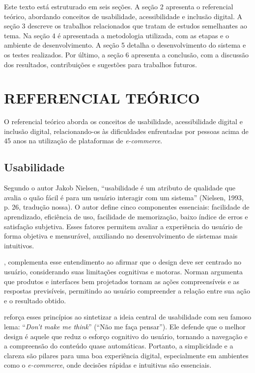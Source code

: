 \documentclass[12pt,a4paper]{article}
\begin{document}
Este texto está estruturado em seis seções. A seção 2 apresenta o referencial teórico, abordando conceitos de usabilidade, acessibilidade e inclusão digital. A seção 3 descreve os trabalhos relacionados que tratam de estudos semelhantes ao tema. Na seção 4 é apresentada a metodologia utilizada, com as etapas e o ambiente de desenvolvimento. A seção 5 detalha o desenvolvimento do sistema e os testes realizados. Por último, a seção 6 apresenta a conclusão, com a discussão dos resultados, contribuições e sugestões para trabalhos futuros.

\section{REFERENCIAL TEÓRICO}

O referencial teórico aborda os conceitos de usabilidade, acessibilidade digital e inclusão digital, relacionando-os às dificuldades enfrentadas por pessoas acima de 45 anos na utilização de plataformas de \textit{e-commerce}.

\subsection{Usabilidade}

Segundo o autor Jakob Nielsen, ``usabilidade é um atributo de qualidade que avalia o quão fácil é para um usuário interagir com um sistema'' (Nielsen, 1993, p. 26, tradução nossa). O autor define cinco componentes essenciais: facilidade de aprendizado, eficiência de uso, facilidade de memorização, baixo índice de erros e satisfação subjetiva. Esses fatores permitem avaliar a experiência do usuário de forma objetiva e mensurável, auxiliando no desenvolvimento de sistemas mais intuitivos.

, complementa esse entendimento ao afirmar que o design deve ser centrado no usuário, considerando suas limitações cognitivas e motoras. Norman argumenta que produtos e interfaces bem projetados tornam as ações compreensíveis e as respostas previsíveis, permitindo ao usuário compreender a relação entre sua ação e o resultado obtido.

 reforça esses princípios ao sintetizar a ideia central de usabilidade com seu famoso lema: ``\textit{Don't make me think}'' (``Não me faça pensar''). Ele defende que o melhor design é aquele que reduz o esforço cognitivo do usuário, tornando a navegação e a compreensão do conteúdo quase automáticas. Portanto, a simplicidade e a clareza são pilares para uma boa experiência digital, especialmente em ambientes como o \textit{e-commerce}, onde decisões rápidas e intuitivas são essenciais.
\end{document}
